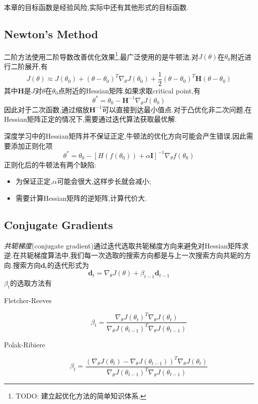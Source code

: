 本章的目标函数是经验风险,实际中还有其他形式的目标函数.

\subsection{Newton's Method}

二阶方法使用二阶导数改善优化效果\footnote{TODO: 建立起优化方法的简单知识体系.},最广泛使用的是牛顿法.对$J(\theta)$在$\theta_0$附近进行二阶展开,有
\begin{equation}
J(\theta)\approx J(\theta_0)+(\theta-\theta_0)^T\nabla_\theta J(\theta_0)+\frac{1}{2}(\theta-\theta_0)^T\mathbf H(\theta-\theta_0)
\end{equation}
其中$\mathbf H$是$J$对$\theta$在$\theta_0$点附近的Hessian矩阵.如果求取critical point,有
\begin{equation}\label{eq:newtown_cirtical_point}
\theta^\ast=\theta_0-\mathbf H^{-1}\nabla_\theta J(\theta_0)
\end{equation}
因此对于二次函数,通过缩放$\mathbf H^{-1}$可以直接到达最小值点.对于凸优化非二次问题,在Hessian矩阵正定的情况下,需要通过迭代算法获取最优解.

深度学习中的Hessian矩阵并不保证正定,牛顿法的优化方向可能会产生错误,因此需要添加正则化项
\begin{equation}
\theta^\ast=\theta_0-\left[H(f(\theta_0))+\alpha\mathbf I\right]^{-1}\nabla_\theta f(\theta_0)
\end{equation}
正则化后的牛顿法有两个缺陷:
\begin{itemize}
    \item 为保证正定,$\alpha$可能会很大,这样步长就会减小;
    \item 需要计算Hessian矩阵的逆矩阵,计算代价大.
\end{itemize}

\subsection{Conjugate Gradients}

\textit{共轭梯度}(conjugate gradient)通过迭代选取共轭梯度方向来避免对Hessian矩阵求逆.在共轭梯度算法中,我们每一次选取的搜索方向都是与上一次搜索方向共轭的方向.搜索方向$\mathbf d_t$的迭代形式为
\begin{equation}
\mathbf d_t=\nabla_\theta J(\theta)+\beta_{t-1}\mathbf d_{t-1}
\end{equation}
$\beta_{t}$的选取方法有
\begin{description}
    \item [Fletcher-Reeves] \begin{equation}\beta_t=\frac{\nabla_\theta J(\theta_t)^T\nabla_\theta J(\theta_t)}{\nabla_\theta J(\theta_{t-1})^T\nabla_\theta J(\theta_{t-1})}\end{equation}
    \item [Polak-Ribiere] \begin{equation}\beta_t=\frac{(\nabla_\theta J(\theta_t)-\nabla_\theta J(\theta_{t-1}))^T\nabla_\theta J(\theta_t)}{\nabla_\theta J(\theta_{t-1})^T\nabla_\theta J(\theta_{t-1})}\end{equation}
\end{description}

